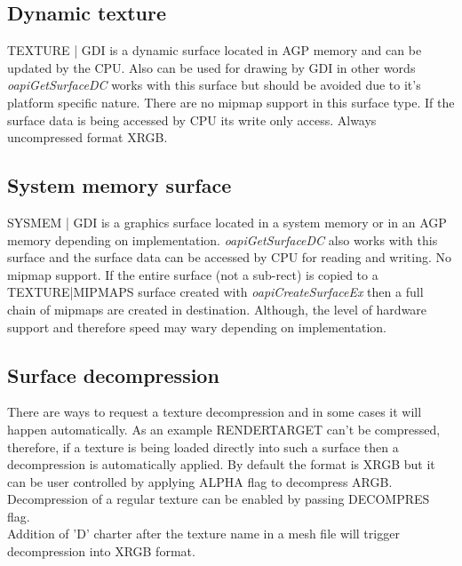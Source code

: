 \documentclass[Orbiter Developer Manual.tex]{subfiles}
\begin{document}
\subsection{Dynamic texture}
\textsc{TEXTURE | GDI} is a dynamic surface located in AGP memory and can be updated by the CPU. Also can be used for drawing by GDI in other words \textit{oapiGetSurfaceDC} works with this surface but should be avoided due to it's platform specific nature. There are no mipmap support in this surface type. If the surface data is being accessed by CPU its write only access. Always uncompressed format XRGB.

\subsection{System memory surface}
\textsc{SYSMEM | GDI} is a graphics surface located in a system memory or in an AGP memory depending on implementation.  \textit{oapiGetSurfaceDC} also works with this surface and the surface data can be accessed by CPU for reading and writing. No mipmap support. If the entire surface (not a sub-rect) is copied to a \textsc{TEXTURE|MIPMAPS} surface created with \textit{oapiCreateSurfaceEx} then a full chain of mipmaps are created in destination. Although, the level of hardware support and therefore speed may wary depending on implementation. 

\subsection{Surface decompression}
There are ways to request a texture decompression and in some cases it will happen automatically. As an example \textsc{RENDERTARGET} can't be compressed, therefore, if a texture is being loaded directly into such a surface then a decompression is automatically applied. By default the format is XRGB but it can be user controlled by applying \textsc{ALPHA} flag to decompress ARGB. Decompression of a regular texture can be enabled by passing \textsc{DECOMPRES} flag.\\

Addition of 'D' charter after the texture name in a mesh file will trigger decompression into XRGB format.
\end{document}

